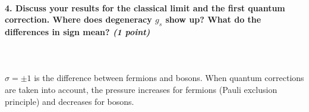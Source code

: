 \paragraph{4. Discuss your results for the classical limit and 
    the first quantum correction. Where does degeneracy $g_s$
    show up? What do the differences in sign mean?
    \textit{(1 point)}
} \ \\
    \\
    $\sigma=\pm 1$ is the difference between fermions and bosons.
    When quantum corrections are taken into account, the pressure 
    increases for fermions (Pauli exclusion principle) and decreases
    for bosons.
